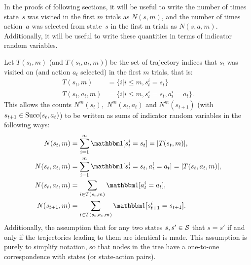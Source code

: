     In the proofs of following sections, it will be useful to write the number of times state~$s$ was visited in the first $m$ trials as $N(s,m)$, and the number of times action~$a$ was selected from state~$s$ in the first m trials as $N(s,a,m).$ Additionally, it will be useful to write these quantities in terms of indicator random variables. 
    
    Let $T(s_t,m)$ (and $T(s_t,a_t,m)$) be the set of trajectory indices that $s_t$ was visited on (and action $a_t$ selected) in the first $m$ trials, that is: 
    \begin{align}
        T(s_t,m) &= \{i | i\leq m, s^i_t = s_t \} \\
        T(s_t,a_t,m) &= \{i | i\leq m, s^i_t = s_t, a^i_t = a_t \}.
    \end{align}
    This allows the counts $N^m(s_t),$ $N^m(s_t,a_t)$ and $N^m(s_{t+1})$ (with $s_{t+1}\in{\textnormal{Succ}(s_t,a_t)}$) to be written as sums of indicator random variables in the following ways:
    \begin{align}
        N(s_t,m) &= \sum_{i=1}^m \one[s^i_t=s_t] = |T(s_t,m)|, \\
        N(s_t,a_t,m) &= \sum_{i=1}^m \one[s^i_t=s_t,a^i_t=a_t] = |T(s_t,a_t,m)|, \\ 
        N(s_t,a_t,m) &= \sum_{i\in T(s_t,m)} \one[a^i_t = a_t], \label{appeq:nsa_sum} \\
        N(s_{t+1},m) &= \sum_{i\in T(s_t,a_t,m)} \one[s^i_{t+1} = s_{t+1}]. \label{appeq:ns_sum}
    \end{align}
    Additionally, the assumption that for any two states $s,s'\in\mathcal{S}$  that $s=s'$ if and only if the trajectories leading to them are identical is made. This assumption is purely to simplify notation, so that nodes in the tree have a one-to-one correspondence with states (or state-action pairs). 
        
        
        
        

